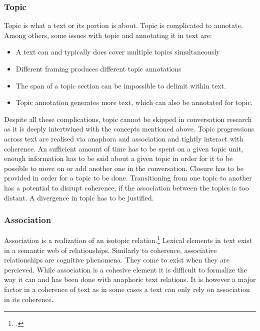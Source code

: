\documentclass[12pt]{report}
\begin{document}
{\subsubsection{Topic}
\par
    Topic is what a text or its portion is about.
    Topic is complicated to annotate.
    Among others, some issues with topic and annotating it in text are:

\begin{itemize}
    \item
    A text can and typically does cover multiple topics simultaneously
    \item
    Different framing produces different topic annotations
    \item
    The span of a topic section can be impossible to delimit within text.
    \item
    Topic annotation generates more text, which can also be annotated for topic.
\end{itemize}

\par
    Despite all these complications,
    topic cannot be skipped in conversation research
    as it is deeply intertwined with the concepts mentioned above.
    Topic progressions across text are realised via anaphora and association
    and tightly interact with coherence.
    An sufficient amount of time has to be spent on a given topic unit,
    enough information has to be said about a given topic
    in order for it to be possible to move on or add another one in the conversation.
    Closure has to be provided in order for a topic to be done.
    Transitioning from one topic to another has a potential to disrupt coherence,
    if the association between the topics is too distant.
    A divergence in topic has to be justified.

\subsubsection{Association}
\par
    Association is a realization of an isotopic relation.\footcite{koblizek2015}
    Lexical elements in text exist in a semantic web of relationships.
    Similarly to coherence, associative relationships are cognitive phenomena.
    They come to exist when they are percieved.
    While association is a cohesive element it is difficult to formalize
    the way it can and has been done with anaphoric text relations.
    It is however a major factor in a coherence of text as
    in some cases a text can only rely on association in its coherence.

}
\end{document}
